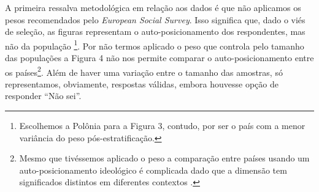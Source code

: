 A primeira ressalva metodológica em relação aos dados é que não aplicamos os
pesos recomendados pelo \textit{European Social Survey}. Isso significa que,
dado o viés de seleção, as figuras representam o auto-posicionamento dos
respondentes, mas não da população \footnote{Escolhemos a Polônia para a Figura
  3, contudo, por ser o país com a menor variância do peso pós-estratificação.}.
Por não termos aplicado o peso que controla pelo tamanho das populações a Figura
4 não nos permite comparar o auto-posicionamento entre os países\footnote{Mesmo
  que tivéssemos aplicado o peso a comparação entre países usando um
  auto-posicionamento ideológico é complicada dado que a dimensão tem
  significados distintos em diferentes contextos \cite{laver2014measuring}. }.
Além de haver uma variação entre o tamanho das amostras, só representamos,
obviamente, respostas válidas, embora houvesse opção de responder ``Não sei''.



